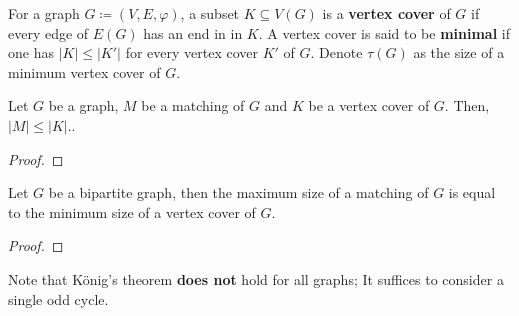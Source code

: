 \begin{definition}
	For a graph \(G \coloneqq (V, E, \varphi)\), a subset \(K \subseteq V(G)\) is a \textbf{vertex cover} of \(G\) if every edge of \(E(G)\) has an end in in \(K\). 
	A vertex cover is said to be \textbf{minimal} if one has \(|K| \leq |K'|\) for every vertex cover \(K'\) of \(G\).
	Denote \(\tau(G)\) as the size of a minimum vertex cover of \(G\).
\end{definition}

\begin{corollary}
	Let \(G\) be a graph, \(M\) be a matching of \(G\) and \(K\) be a vertex cover of \(G\). 
	Then, \(|M| \leq |K|\)..
\end{corollary}

\begin{proof}
	
\end{proof}

\begin{theorem}
	Let \(G\) be a bipartite graph, then the maximum size of a matching of \(G\) is equal to the minimum size of a vertex cover of \(G\).
\end{theorem}

\begin{proof}

\end{proof}

Note that K\"onig's theorem \textbf{does not} hold for all graphs;
It suffices to consider a single odd cycle.

